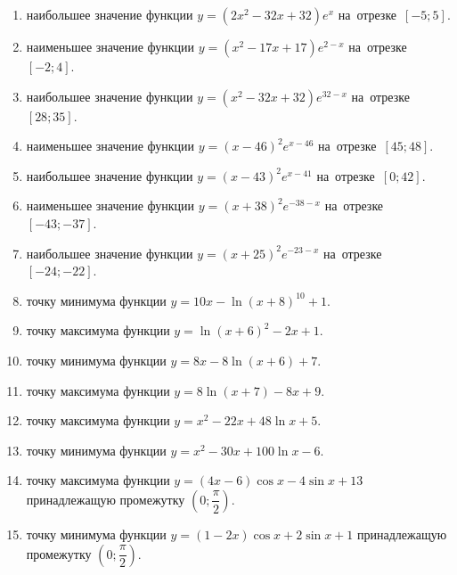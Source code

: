 \documentclass[a4paper,10pt]{article}
\begin{document}
\begin{enumerate}
\item {} наибольшее значение функции $y=\left(2x^2 -32x +32\right)e^{x}$ на~отрезке~$\left[-5;5\right]$.

\item {} наименьшее значение функции $y=\left(x^2 -17x +17\right)e^{2-x}$ на~отрезке~$\left[-2;4\right]$.

\item {} наибольшее значение функции $y=\left(x^2 -32x +32\right)e^{32-x}$ на~отрезке~$\left[28;35\right]$.

\item {} наименьшее значение функции $y=\left(x-46\right)^2e^{x-46}$ на~отрезке~$\left[45;48\right]$.

\item {} наибольшее значение функции $y=\left(x-43\right)^2e^{x-41}$ на~отрезке~$\left[0;42\right]$.

\item {} наименьшее значение функции $y=\left(x+38\right)^2e^{-38-x}$ на~отрезке~$\left[-43;-37\right]$.

\item {} наибольшее значение функции $y=\left(x+25\right)^2e^{-23-x}$ на~отрезке~$\left[-24;-22\right]$.

\item {} точку минимума функции $y=10x-\ln\left(x+8\right)^{10}+1$.

\item {} точку максимума функции $y=\ln\left(x+6\right)^{2}-2x+1$.

\item {} точку минимума функции $y=8x-8\ln\left(x+6\right)+7$.

\item {} точку максимума функции $y=8\ln\left(x+7\right)-8x+9$.

\item {} точку максимума функции $y=x^2-22x+48\ln x +5$.

\item {} точку минимума функции $y=x^2-30x+100\ln x -6$.

\item {} точку максимума функции $y=\left(4x-6\right)\cos x -4\sin x+13$
принадлежащую промежутку $\left(0;\dfrac{\pi}{2}\right)$.

\item {} точку минимума функции $y=\left(1-2x\right)\cos x +2\sin x+1$
принадлежащую промежутку $\left(0;\dfrac{\pi}{2}\right)$.


\end{enumerate}
\end{document}
